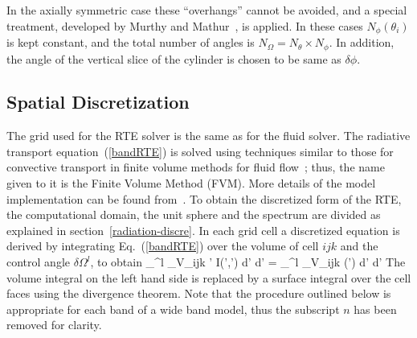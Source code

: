In the axially symmetric case these ``overhangs'' cannot be avoided, and a
special treatment, developed by Murthy and Mathur~\cite{Murthy}, is
applied. In these cases $N_{\phi}(\theta_i)$ is kept constant, and
the total number of angles is $N_{\Omega} = N_{\theta} \times
N_{\phi}$. In addition, the angle of the vertical slice of the cylinder is
chosen to be same as $\delta\phi$.



\subsection{Spatial Discretization}

The grid used for the RTE solver is the same as for the fluid solver.
The radiative transport equation~(\ref{bandRTE}) is solved using
techniques similar to those for convective transport in finite volume
methods for fluid flow~\cite{Raithby}; thus, the name given to it is
the Finite Volume Method (FVM). More details of the model
implementation can be found from~\cite{Hostikka:2008}.
To obtain the discretized form of the
RTE, the computational domain, the unit sphere and the spectrum are divided as explained in section~\ref{radiation-discre}.
In each grid cell a discretized equation is derived by integrating
Eq.~(\ref{bandRTE}) over the volume of cell $ijk$ and the control
angle $\delta \Omega^l$, to obtain
\be
  \int_{\delta \Omega^l} \int_{V_{ijk}}
   \bs' \cdot \nabla I(\bx',\bs') d\bx' d\bs' =
   \int_{\delta \Omega^l} \int_{V_{ijk}} \kappa(\bx') \;
    \left[ I_{b}(\bx') - I(\bx',\bs') \right] d\bx' d\bs'
\ee
The volume integral on the left hand side is replaced by a surface
integral over the cell faces using the divergence theorem. Note that
the procedure outlined below is appropriate for each band of a wide
band model, thus the subscript $n$ has been removed for clarity.

